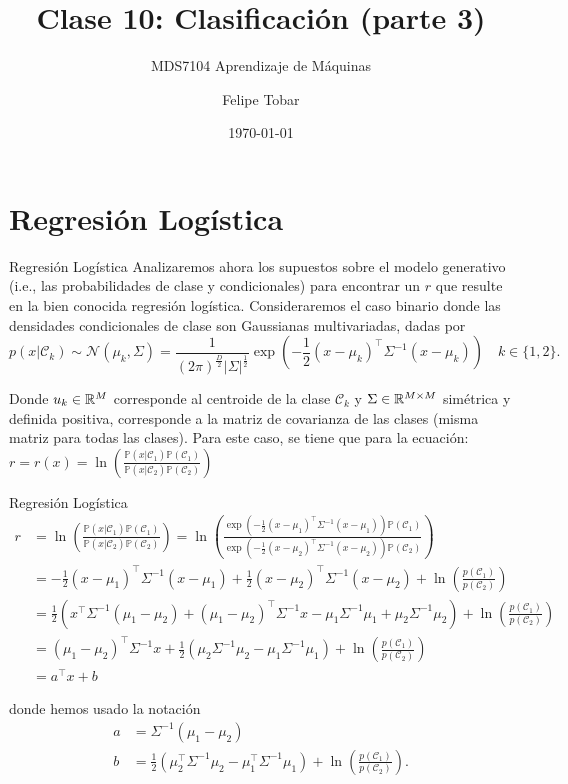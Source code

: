 \documentclass[9pt, handout]{beamer}
\title{Clase 10: Clasificación (parte 3)}
\subtitle{MDS7104 Aprendizaje de Máquinas}
\date{\today}
\author{Felipe Tobar}
\institute{Iniciativa de Datos e Inteligencia Artificial\\Universidad de Chile}
\begin{document}
\begin{frame}
  \titlepage
\end{frame}

\section{Regresión Logística}
\begin{frame}{Regresión Logística}
Analizaremos ahora  los supuestos sobre el modelo generativo (i.e., las  probabilidades de clase y condicionales) para encontrar un $r$ que resulte en la bien conocida regresión logística. \pause 
Consideraremos el caso binario donde las densidades condicionales de clase son Gaussianas multivariadas, dadas por 
\begin{equation*}
  p(x|\mathcal{C}_k) \sim \mathcal{N} (\mu_k,\Sigma) = \frac{1}{(2\pi)^\frac{D}{2}|\Sigma|^\frac{1}{2}}\exp(-\frac{1}{2}(x-\mu_k)^\top \Sigma^{-1}(x-\mu_k))\quad k\in\{1,2\}.
\end{equation*} \pause 

Donde $u_k\in\mathbb{R}^M$ corresponde al centroide de la clase $\mathcal{C}_k$ y $\Sigma\in\mathbb{R}^{M\times M}$ simétrica y definida positiva, corresponde a la matriz de covarianza de las clases (misma matriz para todas las clases). Para este caso, se tiene que para la ecuación: $r = r(x) =\ln\left(\frac{\mathbb{P}(x|\mathcal{C}_1)\mathbb{P}(\mathcal{C}_1)}{\mathbb{P}(x|\mathcal{C}_2)\mathbb{P}(\mathcal{C}_2)}\right)$ 


\end{frame}

\begin{frame}{Regresión Logística}
\begin{align*}
r &= \ln\left(\frac{\mathbb{P}(x|\mathcal{C}_1)\mathbb{P}(\mathcal{C}_1)}{\mathbb{P}(x|\mathcal{C}_2)\mathbb{P}(\mathcal{C}_2)}\right) = \ln\left(\frac{\exp(-\frac{1}{2}(x-\mu_1)^\top \Sigma^{-1}(x-\mu_1))\mathbb{P}(\mathcal{C}_1)}{\exp(-\frac{1}{2}(x-\mu_2)^\top \Sigma^{-1}(x-\mu_2))\mathbb{P}(\mathcal{C}_2)}\right)\\
&= -\frac{1}{2}(x-\mu_1)^\top \Sigma^{-1}(x-\mu_1) +\frac{1}{2}(x-\mu_2)^\top \Sigma^{-1}(x-\mu_2) + \ln\left(\frac{p(\mathcal{C}_1)}{p(\mathcal{C}_2)}\right)\\
&= \frac{1}{2}\left(x^\top\Sigma^{-1}(\mu_1-\mu_2) + (\mu_1-\mu_2)^\top\Sigma^{-1}x - \mu_1\Sigma^{-1}\mu_1 + \mu_2\Sigma^{-1}\mu_2 \right) + \ln\left(\frac{p(\mathcal{C}_1)}{p(\mathcal{C}_2)}\right)\\
&= (\mu_1-\mu_2)^\top\Sigma^{-1}x + \frac{1}{2}\left(\mu_2\Sigma^{-1}\mu_2 - \mu_1\Sigma^{-1}\mu_1 \right)+ \ln\left(\frac{p(\mathcal{C}_1)}{p(\mathcal{C}_2)}\right)\\
&= a^\top x+b
\end{align*} \pause

donde hemos usado la notación
\begin{align*}
a &= \Sigma^{-1}(\mu_1-\mu_2)\\
b &= \frac{1}{2}(\mu_2^\top \Sigma^{-1}\mu_2-\mu_1^\top \Sigma^{-1}\mu_1)
+\ln\left(\frac{p(\mathcal{C}_1)}{p(\mathcal{C}_2)}\right). 
\end{align*}

\end{frame}
\end{document}
